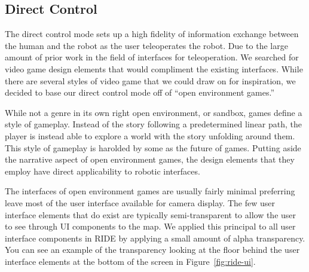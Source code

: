 
% 
% 
% 
% 

\subsection{Direct Control}

The direct control mode sets up a high fidelity of information exchange between the human and the robot as the user teleoperates the robot. Due to the large amount of prior work in the field of interfaces for teleoperation. We searched for video game design elements that would compliment the existing interfaces. While there are several styles of video game that we could draw on for inspiration, we decided to base our direct control mode off of ``open environment games.''

While not a genre in its own right open environment, or sandbox, games define a style of gameplay. Instead of the story following a predetermined linear path, the player is instead able to explore a world with the story unfolding around them. This style of gameplay is harolded by some as the future of games. Putting aside the narrative aspect of open environment games, the design elements that they employ have direct applicability to robotic interfaces.

The interfaces of open environment games are usually fairly minimal preferring leave most of the user interface available for camera display. The few user interface elements that do exist are typically semi-transparent to allow the user to see through UI components to the map. We applied this principal to all user interface components in RIDE by applying a small amount of alpha transparency. You can see an example of the transparency looking at the floor behind the user interface elements at the bottom of the screen in Figure~\ref{fig:ride-ui}.

